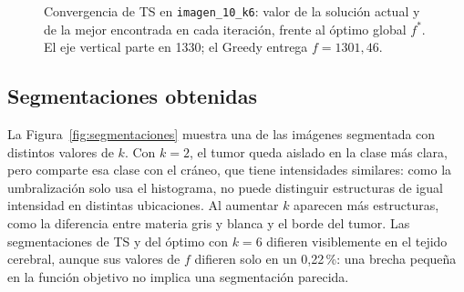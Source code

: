 \documentclass[letter, 10pt]{article}
\begin{document}
\begin{figure}[h]
    \centering
    \hfill
    \caption{Convergencia de TS en \texttt{imagen\_10\_k6}: valor de la solución actual y de la mejor encontrada en cada iteración, frente al óptimo global $f^*$. El eje vertical parte en 1330; el Greedy entrega $f = 1301{,}46$.}
    \label{fig:convergencia}
\end{figure}

\subsection{Segmentaciones obtenidas}
La Figura~\ref{fig:segmentaciones} muestra una de las imágenes segmentada con distintos valores de $k$. Con $k = 2$, el tumor queda aislado en la clase más clara, pero comparte esa clase con el cráneo, que tiene intensidades similares: como la umbralización solo usa el histograma, no puede distinguir estructuras de igual intensidad en distintas ubicaciones. Al aumentar $k$ aparecen más estructuras, como la diferencia entre materia gris y blanca y el borde del tumor. Las segmentaciones de TS y del óptimo con $k = 6$ difieren visiblemente en el tejido cerebral, aunque sus valores de $f$ difieren solo en un 0,22\,\%: una brecha pequeña en la función objetivo no implica una segmentación parecida.
\end{document}
